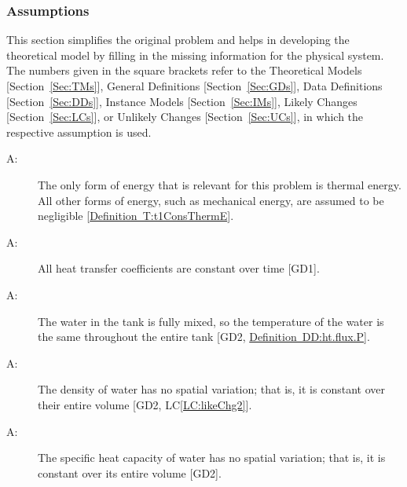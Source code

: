 \documentclass[12pt]{article}
\newcounter{assumpnum}
\newcommand{\atheassumpnum}{A\theassumpnum}
\begin{document}
\subsubsection{Assumptions}
\label{Sec:Assumps}
This section simplifies the original problem and helps in developing the theoretical model by filling in the missing information for the physical system. The numbers given in the square brackets refer to the Theoretical Models {[}Section~\ref{Sec:TMs}{]}, General Definitions {[}Section~\ref{Sec:GDs}{]}, Data Definitions {[}Section~\ref{Sec:DDs}{]}, Instance Models {[}Section~\ref{Sec:IMs}{]}, Likely Changes {[}Section~\ref{Sec:LCs}{]}, or Unlikely Changes {[}Section~\ref{Sec:UCs}{]}, in which the respective assumption is used.
\begin{description}
\item[\atheassumpnum\label{A:Thermal-Energy-Only}:]The only form of energy that is relevant for this problem is thermal energy. All other forms of energy, such as mechanical energy, are assumed to be negligible {[}\hyperref[T:t1ConsThermE]{Definition~T:t1ConsThermE}{]}.
\end{description}
\begin{description}
\item[\atheassumpnum\label{A:Heat-Transfer-Coeffs-Constant}:]All heat transfer coefficients are constant over time {[}GD1{]}.
\end{description}
\begin{description}
\item[\atheassumpnum\label{A:Constant-Water-Temp-Across-Tank}:]The water in the tank is fully mixed, so the temperature of the water is the same throughout the entire tank {[}GD2, \hyperref[DD:ht.flux.P]{Definition~DD:ht.flux.P}{]}.
\end{description}
\begin{description}
\item[\atheassumpnum\label{A:Density-Water-Constant-over-Volume}:]The density of water has no spatial variation; that is, it is constant over their entire volume {[}GD2, LC\ref{LC:likeChg2}{]}.
\end{description}
\begin{description}
\item[\atheassumpnum\label{A:Specific-Heat-Energy-Constant-over-Volume}:]The specific heat capacity of water has no spatial variation; that is, it is constant over its entire volume {[}GD2{]}.
\end{description}
\end{document}
